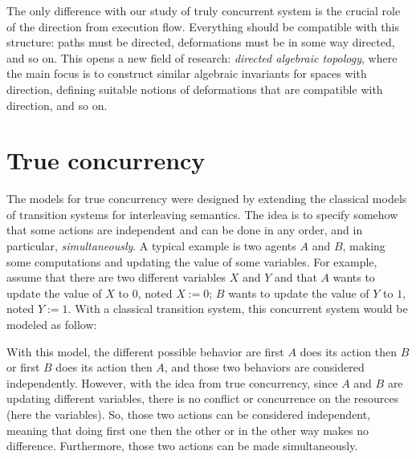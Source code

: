 The only difference with our study of truly concurrent system is the crucial role of the direction from execution flow. Everything should be compatible with this structure: paths must be directed, deformations must be in some way directed, and so on. This opens a new field of research: \emph{directed algebraic topology}, where the main focus is to construct similar algebraic invariants for spaces with direction, defining suitable notions of deformations that are compatible with direction, and so on.


\section*{True concurrency}

The models for true concurrency were designed by extending the classical models of transition systems for interleaving semantics. The idea is to specify somehow that some actions are independent and can be done in any order, and in particular, \emph{simultaneously}. A typical example is two agents $A$ and $B$, making some computations and updating the value of some variables. For example, assume that there are two different variables $X$ and $Y$ and that $A$ wants to update the value of $X$ to $0$, noted $X := 0$; $B$ wants to update the value of $Y$ to $1$, noted $Y := 1$. With a classical transition system, this concurrent system would be modeled as follow:
	\begin{figure}[H]
		\begin{center}
    			
  		\end{center}
	\end{figure}
With this model, the different possible behavior are first $A$ does its action then $B$ or first $B$ does its action then $A$, and those two behaviors are considered independently. However, with the idea from true concurrency, since $A$ and $B$ are updating different variables, there is no conflict or concurrence on the resources (here the variables). So, those two actions can be considered independent, meaning that doing first one then the other or in the other way makes no difference. Furthermore, those two actions can be made simultaneously. 

